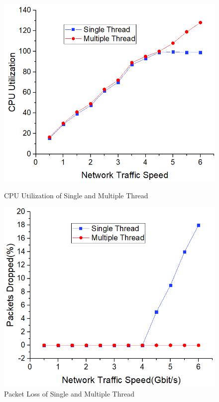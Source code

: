\documentclass[conference]{IEEEtran}
\begin{document}
\begin{figure}
\begin{minipage}[t]{0.495\linewidth}
\flushleft
\includegraphics[width=\textwidth]{./picture/Figure10.jpg}
\caption{CPU Utilization of Single and Multiple Thread} 
\label{fig:11}
\end{minipage}
\begin{minipage}[t]{0.495\linewidth}
\flushright
\includegraphics[width=\textwidth]{./picture/Figure11.jpg}
\caption{Packet Loss of Single and Multiple Thread}
\label{fig:12}
\end{minipage}
\end{figure} 
\end{document}
